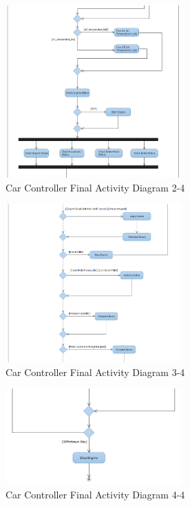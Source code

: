 \documentclass[12pt]{article}
\begin{document}
\begin{figure}[H]
	\centering
	\includegraphics[width=0.6\textwidth]{activity_diagram_v2}
	\caption{Car Controller Final Activity Diagram 2-4}
	\label{fig:act2}
\end{figure}


\begin{figure}[H]
	\centering
	\includegraphics[width=0.6\textwidth]{activity_diagram_v3}
	\caption{Car Controller Final Activity Diagram 3-4}
	\label{fig:act3}
\end{figure}

\begin{figure}[H]
	\centering
	\includegraphics[width=0.6\textwidth]{activity_diagram_v4}
	\caption{Car Controller Final Activity Diagram 4-4}
	\label{fig:act4}
\end{figure}
\end{document}
